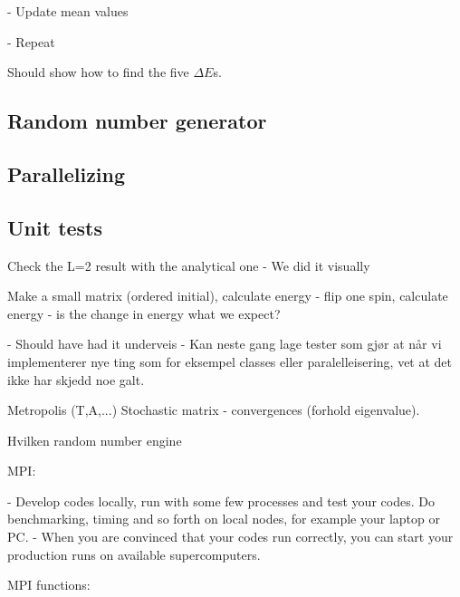 - Update mean values

- Repeat  

Should show how to find the five $\Delta E$s.

\subsection{Random number generator}

\subsection{Parallelizing}

\subsection{Unit tests}

Check the L=2 result with the analytical one
 - We did it visually

Make a small matrix (ordered initial), calculate energy - flip one spin, calculate energy - is the change in energy what we expect? 

 - Should have had it underveis
 - Kan neste gang lage tester som gjør at når vi implementerer nye ting som for eksempel classes eller paralelleisering, vet at det ikke har skjedd noe galt.




Metropolis (T,A,...)
	Stochastic matrix  - convergences (forhold eigenvalue).
	
	Hvilken random number engine
	
MPI:	
	
- Develop codes locally, run with some few processes and test your codes. Do benchmarking, timing and so forth on local nodes, for example your laptop or PC.
- When you are convinced that your codes run correctly, you can start your production runs on available supercomputers.
	
	
MPI functions:
%
%
%
%
%
%
%
